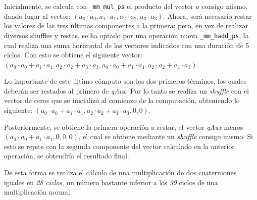 \documentclass[conference]{IEEEtran}
\begin{document}
Inicialmente, se calcula con \texttt{\_mm\_mul\_ps} el producto del vector $a$ consigo mismo, dando lugar al vector: $(a_{0}\cdot a_{0}, a_{1}\cdot a_{1}, a_{2}\cdot a_{2}, a_{3}\cdot a_{3})$. Ahora, será necesario restar los valores de las tres últimas componentes a la primera; pero, en vez de realizar diversos shuffles y restas, se ha optado por una operación nueva \texttt{\_mm\_hadd\_ps}, la cual realiza una suma horizontal de los vectores indicados con una duración de 5 ciclos. Con esto se obtiene el siguiente vector: $(a_{0}\cdot a_{0}+a_{1}\cdot a_{1}, a_{2}\cdot a_{2}+a_{3}\cdot a_{3}, a_{0}\cdot a_{0}+a_{1}\cdot a_{1}, a_{2}\cdot a_{2}+a_{3}\cdot a_{3})$.

Lo importante de este último cómputo son los dos primeros términos, los cuales deberán ser restados al primero de \textit{qAux}. Por lo tanto se realiza un \textit{shuffle} con el vector de ceros que se inicializó al comienzo de la computación, obteniendo lo siguiente: $(a_{0}\cdot a_{0}+a_{1}\cdot a_{1}, a_{2}\cdot a_{2}+a_{3}\cdot a_{3}, 0, 0)$.

Posteriormente, se obtiene la primera operación a restar, el vector \textit{qAux} menos $(a_{0}\cdot a_{0}+a_{1}\cdot a_{1}, 0, 0, 0)$, el cual se obtiene mediante un \textit{shuffle} consigo mismo. Si esto se repite con la segunda componente del vector calculado en la anterior operación, se obtendría el resultado final.

De esta forma se realiza el cálculo de una multiplicación de dos cuaterniones iguales en \textit{28 ciclos}, un número bastante inferior a los \textit{39} ciclos de una multiplicación normal.
\end{document}
